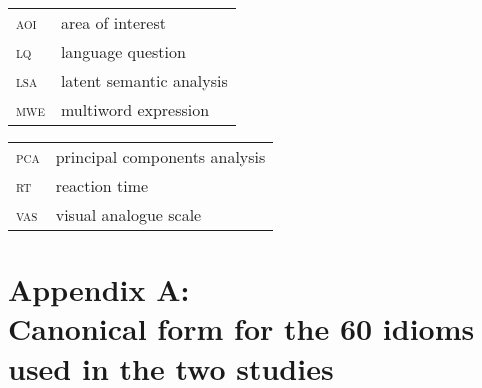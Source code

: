 \documentclass[output=paper
,modfonts
,nonflat]{langsci/langscibook}
\begin{document}
\begin{tabularx}{.48\textwidth}{ll}
\textsc{aoi} & area of interest  \\
\textsc{lq} & language question   \\
\textsc{lsa} & latent semantic analysis  \\
\textsc{mwe} & multiword expression \\
\end{tabularx}
\begin{tabularx}{.48\textwidth}{ll}
\textsc{pca} & principal components analysis  \\
\textsc{rt} & reaction time   \\
\textsc{vas} & visual analogue scale   \\
\end{tabularx}


\newpage
\section*{Appendix A:\\ 
Canonical form for the 60 idioms used in the two studies}
\label{IdiomsAppendix}
\end{document}
